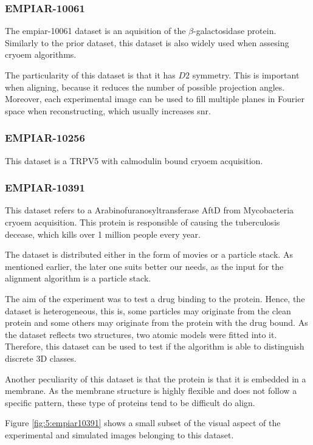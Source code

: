 \documentclass[../main.tex]{subfiles}
\begin{document}
\subsubsection{EMPIAR-10061}
The \gls{empiar}-10061 dataset is an aquisition of the $\beta$-galactosidase protein. Similarly to the prior dataset, this dataset is also widely used when assesing \gls{cryoem} algorithms. 

The particularity of this dataset is that it has $D2$ symmetry. This is important when aligning, because it reduces the number of possible projection angles. Moreover, each experimental image can be used to fill multiple planes in Fourier space when reconstructing, which usually increases \gls{snr}. 

\subsubsection{EMPIAR-10256}
This dataset is  a TRPV5 with calmodulin bound \gls{cryoem} acquisition\cite{dang2019}. 

\subsubsection{EMPIAR-10391}
This dataset refers to a Arabinofuranosyltransferase AftD from Mycobacteria \gls{cryoem} acquisition. This protein is responsible of causing the tuberculosis decease, which kills over 1 million people every year\cite{tan2020}.

The dataset is distributed either in the form of movies or a particle stack. As mentioned earlier, the later one suits better our needs, as the input for the alignment algorithm is a particle stack.

The aim of the experiment was to test a drug binding to the protein. Hence, the dataset is heterogeneous, this is, some particles may originate from the clean protein and some others may originate from the protein with the drug bound. As the dataset reflects two structures, two atomic models were fitted into it. Therefore, this dataset can be used to test if the algorithm is able to distinguish discrete 3D classes. 

Another peculiarity of this dataset is that the protein is that it is embedded in a membrane. As the membrane structure is highly flexible and does not follow a specific pattern, these type of proteins tend to be difficult do align.

Figure \ref{fig:5:empiar10391} shows a small subset of the visual aspect of the experimental and simulated images belonging to this dataset.
\end{document}
